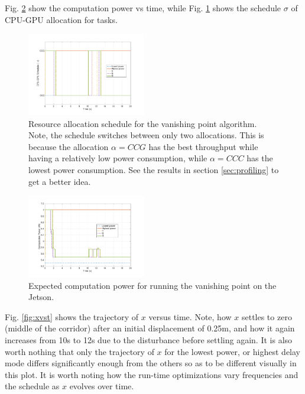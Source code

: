 Fig. \ref{fig:power} show the computation power vs time, while Fig. \ref{fig:schedule} shows the schedule $\sigma$ of CPU-GPU allocation for tasks.

\begin{figure}[hbtp]
\centering
\includegraphics[width=0.46\textwidth]{../simulations/figs/schedule.pdf}
\caption{Resource allocation schedule for the vanishing point algorithm. Note, the schedule switches between only two allocations. This is because the allocation $\alpha=CCG$ has the best throughput while having a relatively low power consumption, while $\alpha=CCC$ has the lowest power consumption. See the results in section \ref{sec:profiling} to get a better idea.}
\label{fig:schedule} 
\end{figure}

\begin{figure}[hbtp]
\centering
\includegraphics[width=0.46\textwidth]{../simulations/figs/power.pdf}
\caption{Expected computation power for running the vanishing point on the Jetson.}
\label{fig:power} 
\end{figure}

Fig. \ref{fig:xvst} shows the trajectory of $x$ versus time. Note, how $x$ settles to zero (middle of the corridor) after an initial displacement of 0.25m, and how it again increases from 10s to 12s due to the disturbance before settling again. It is also worth nothing that only the trajectory of $x$ for the lowest power, or highest delay mode differs significantly enough from the others so as to be different visually in this plot. It is worth noting how the run-time optimizations vary frequencies and the schedule as $x$ evolves over time.


